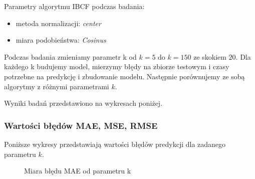 \documentclass[12pt, a4paper]{article}
\begin{document}
Parametry algorytmu IBCF podczas badania:
\begin{itemize}
\item metoda normalizacji: \emph{center}
\item miara podobieństwa: \emph{Cosinus}
\end{itemize}

Podczas badania zmieniamy parametr k od $k=5$ do $k=150$ ze skokiem $20$. Dla każdego k budujemy model, mierzymy błędy na zbiorze testowym i czasy potrzebne na predykcję i zbudowanie modelu. Następnie porównujemy ze sobą algorytmy z różnymi parametrami $k$.

Wyniki badań przedstawiono na wykresach poniżej. 

\subsubsection{Wartości błędów MAE, MSE, RMSE}
Poniższe wykresy przedstawiają wartości błędów predykcji dla zadanego parametru $k$.

\begin{figure}[H]
  \begin{center}
  \end{center}
  \caption{Miara błędu MAE od parametru k}
  \label{fig:ibcf-k-mae}
\end{figure}
\end{document}
